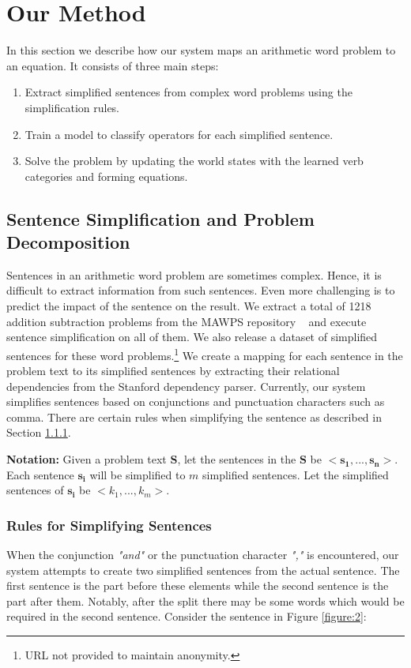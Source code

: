 \documentclass[11pt]{article}
\begin{document}
\section{Our Method}
In this section we describe how our system maps an arithmetic word problem to an equation. It consists of three main steps:
\begin{enumerate}[topsep=0pt,itemsep=-1ex,partopsep=1ex,parsep=1ex]
\item Extract simplified sentences from complex word problems using the simplification rules. 
\item Train a model to classify operators for each simplified sentence.
\item Solve the problem by updating the world states with the learned verb categories and forming equations.
\end{enumerate}

\subsection{Sentence Simplification and Problem Decomposition}
Sentences in an arithmetic word problem are sometimes complex. Hence, it is difficult to extract information from such sentences. Even more challenging is to predict the impact of the sentence on the result. We extract a total of 1218 addition subtraction problems from the MAWPS repository ~\cite{MAWPS} and execute sentence simplification on all of them. We also release a dataset of simplified sentences for these word problems.\footnote{URL not provided to maintain anonymity.} We create a mapping for each sentence in the problem text to its simplified sentences by extracting their relational dependencies from the Stanford dependency parser. Currently, our system simplifies sentences based on conjunctions and punctuation characters such as comma. There are certain rules when simplifying the sentence as described in Section \ref{sec:SimplificationRules}.

\textbf{Notation:} Given a problem text $\mathbf{S}$, let the sentences in the $\mathbf{S}$ be $\mathbf{<s_{1},..., s_{n}>}$. Each sentence $\mathbf{s_{i}}$ will be simplified to \begin{math}m\end{math} simplified sentences. Let the simplified sentences of $\mathbf{s_{i}}$ be $\mathit{<k_{1},..., k_{m}>}$.

\subsubsection{Rules for Simplifying Sentences}\label{sec:SimplificationRules}
When the conjunction \textit{"and"} or  the punctuation character \textit{","} is encountered, our system attempts to create two simplified sentences from the actual sentence. The first sentence is the part before these elements while the second sentence is the part after them. Notably, after the split there may be some words which would be required in the second sentence. Consider the sentence in Figure \ref{figure:2}: 
\end{document}
